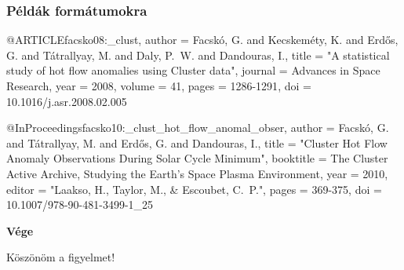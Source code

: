 \documentclass[aspectratio=169]{beamer}
\begin{document}
\begin{frame}
\frametitle{Példák  formátumokra}

\begin{verbatim*}
@ARTICLE{facsko08:_clust,
   author = {{Facsk{\'o}}, G. and {Kecskem{\'e}ty}, K. and 
{Erd{\H o}s}, G. and {T{\'a}trallyay}, M. and 
{Daly}, P.~W. and {Dandouras}, I.},
    title = "{A statistical study of hot flow 
anomalies using Cluster data}",
  journal = {Advances in Space Research},
     year = 2008,
   volume = 41,
    pages = {1286-1291},
      doi = {10.1016/j.asr.2008.02.005}
}
\end{verbatim*}
\vfill


\begin{verbatim*}
@Book{laakso10:_clust_activ_archiv,
  editor = 	 {{Laakso}, H. and {Taylor}, M. 
and {Escoubet}, C.~P.}
  title = 	 {The Cluster Active Archive},
  publisher = 	 {Springer Science+Business Media B.V.},
  year = 	 2010,
  note = {Astrophysics and Space Science Proceedings, 
ISBN 978-90-481-3498-4}},
  doi = {10.1007/978-90-481-3499-1}
}
\end{verbatim*}
\vfill


\begin{verbatim*}
@InProceedings{facsko10:_clust_hot_flow_anomal_obser,
   author = {{Facsk{\'o}}, G. and {T{\'a}trallyay}, M. and 
{Erd{\H o}s}, G. and {Dandouras}, I.},
    title = "{Cluster Hot Flow Anomaly Observations 
During Solar Cycle Minimum}",
booktitle = {The Cluster Active Archive, Studying 
the Earth's Space Plasma Environment},
     year = 2010,
   editor = "{Laakso, H., Taylor, M., \& Escoubet, C.~P.}",
    pages = {369-375},
      doi = {10.1007/978-90-481-3499-1\_25}
}
\end{verbatim*}
\vfill
\end{frame}


\begin{frame}

\vfill
\begin{center}
\textbf{\huge Vége}

\bigskip
Köszönöm a figyelmet!
\end{center}
\vfill
\end{frame}
\end{document}
